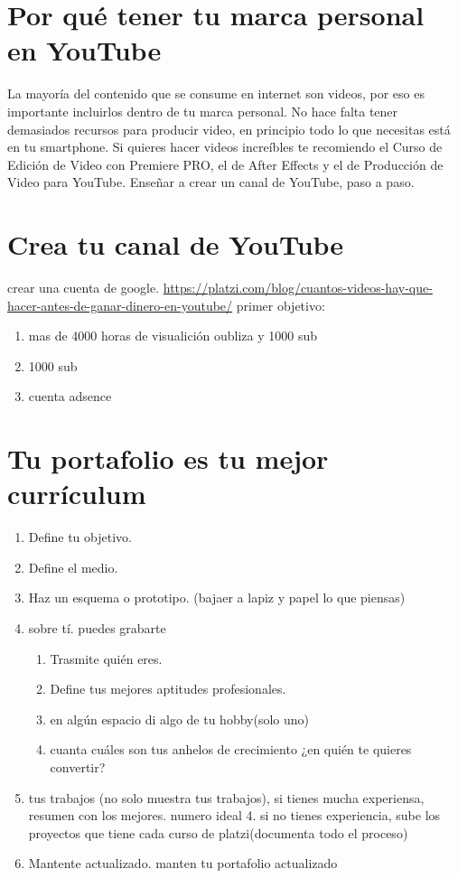 \documentclass{article}
\begin{document}
    \section{Por qué tener tu marca personal en YouTube}
    La mayoría del contenido que se consume en internet son videos, por eso es importante incluirlos dentro de tu marca personal. No hace falta tener demasiados recursos para producir video, en principio todo lo que necesitas está en tu smartphone. Si quieres hacer videos increíbles te recomiendo el Curso de Edición de Video con Premiere PRO, el de After Effects y el de Producción de Video para YouTube.
    Enseñar a crear un canal de YouTube, paso a paso.
    \section{Crea tu canal de YouTube}
    crear una cuenta de google.
    \url{https://platzi.com/blog/cuantos-videos-hay-que-hacer-antes-de-ganar-dinero-en-youtube/}
    primer objetivo:\\
    \begin{enumerate}
        \item mas de 4000 horas de visualición oubliza y 1000 sub
        \item 1000 sub
        \item cuenta adsence
    \end{enumerate}

    \section{Tu portafolio es tu mejor currículum}
    \begin{enumerate}
        \item Define tu objetivo.
        \item Define el medio.
        \item Haz un esquema o prototipo. (bajaer a lapiz y papel lo que piensas)
        \item sobre tí. puedes grabarte
        \begin{enumerate}
            \item Trasmite quién eres. 
            \item Define tus mejores aptitudes profesionales.
            \item en algún espacio di algo de tu hobby(solo uno)
            \item cuanta cuáles son tus anhelos de crecimiento ¿en quién te quieres convertir?
        \end{enumerate}
        \item tus trabajos (no solo muestra tus trabajos), si tienes mucha experiensa, resumen con los mejores. numero ideal 4.
        si no tienes experiencia, sube los proyectos que tiene cada curso de platzi(documenta todo el proceso)
        \item Mantente actualizado. manten tu portafolio actualizado
    \end{enumerate}
\end{document}
